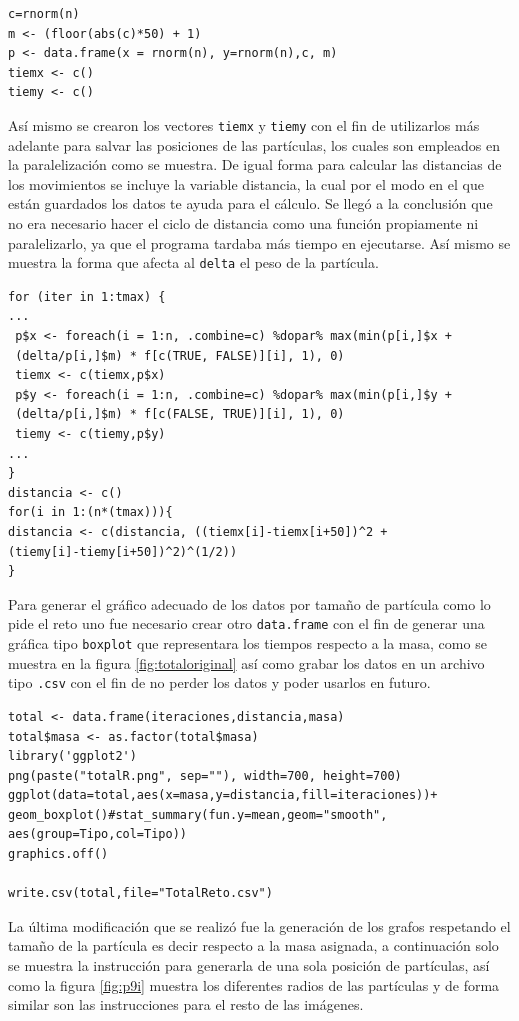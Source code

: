 \documentclass[a4paper]{article}
\begin{document}
\begin{lstlisting}[frame=single]
c=rnorm(n)
m <- (floor(abs(c)*50) + 1)
p <- data.frame(x = rnorm(n), y=rnorm(n),c, m)
tiemx <- c()
tiemy <- c()
\end{lstlisting}

Así mismo se crearon los vectores \texttt{tiemx} y \texttt{tiemy} con el fin de utilizarlos más adelante para salvar las posiciones de las partículas, los cuales son empleados en la paralelización como se muestra. De igual forma para calcular las distancias de los movimientos se incluye la variable distancia, la cual por el modo en el que están guardados los datos te ayuda para el cálculo. Se llegó a la conclusión que no era necesario hacer el ciclo de distancia como una función propiamente ni paralelizarlo, ya que el programa tardaba más tiempo en ejecutarse. Así mismo se muestra la forma que afecta al \texttt{delta} el peso de la partícula.

\begin{lstlisting}[frame=single]
for (iter in 1:tmax) {
...
 p$x <- foreach(i = 1:n, .combine=c) %dopar% max(min(p[i,]$x + 
 (delta/p[i,]$m) * f[c(TRUE, FALSE)][i], 1), 0)
 tiemx <- c(tiemx,p$x)
 p$y <- foreach(i = 1:n, .combine=c) %dopar% max(min(p[i,]$y + 
 (delta/p[i,]$m) * f[c(FALSE, TRUE)][i], 1), 0)
 tiemy <- c(tiemy,p$y)
...
}
distancia <- c()
for(i in 1:(n*(tmax))){
distancia <- c(distancia, ((tiemx[i]-tiemx[i+50])^2 + 
(tiemy[i]-tiemy[i+50])^2)^(1/2))
}
\end{lstlisting}
Para generar el gráfico adecuado de los datos por tamaño de partícula como lo pide el reto uno fue necesario crear otro \texttt{data.frame} con el fin de generar una gráfica tipo \texttt{boxplot} que representara los tiempos respecto a la masa, como se muestra en la figura \ref{fig:totaloriginal} así como grabar los datos en un archivo tipo \texttt{.csv} con el fin de no perder los datos y poder usarlos en futuro.

\begin{lstlisting}[frame=single]
total <- data.frame(iteraciones,distancia,masa)
total$masa <- as.factor(total$masa)
library('ggplot2')
png(paste("totalR.png", sep=""), width=700, height=700)
ggplot(data=total,aes(x=masa,y=distancia,fill=iteraciones))+
geom_boxplot()#stat_summary(fun.y=mean,geom="smooth",
aes(group=Tipo,col=Tipo))
graphics.off()

write.csv(total,file="TotalReto.csv")
\end{lstlisting}
La última modificación que se realizó fue la generación de los grafos respetando el tamaño de la partícula es decir respecto a la masa asignada, a continuación solo se muestra la instrucción para generarla de una sola posición de partículas, así como la figura \ref{fig:p9i} muestra los diferentes radios de las partículas y de forma similar son las instrucciones para el resto de las imágenes.
\end{document}
